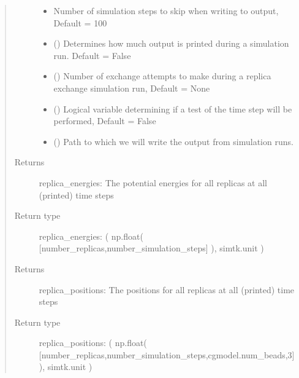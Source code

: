 \documentclass[letterpaper,12pt,english,openany,oneside]{sphinxmanual}
\begin{document}
\begin{fulllineitems}
\begin{quote}
\begin{description}
\begin{itemize}
\item {} 
 \textendash{} Number of simulation steps to skip when writing to output, Default = 100

\item {} 
 () \textendash{} Determines how much output is printed during a simulation run.  Default = False

\item {} 
 () \textendash{} Number of exchange attempts to make during a replica exchange simulation run, Default = None

\item {} 
 () \textendash{} Logical variable determining if a test of the time step will be performed, Default = False

\item {} 
 () \textendash{} Path to which we will write the output from simulation runs.

\end{itemize}

\item[{Returns}] \leavevmode
replica\_energies: The potential energies for all replicas at all (printed) time steps

\item[{Return type}] \leavevmode

replica\_energies:  ( np.float( {[}number\_replicas,number\_simulation\_steps{]} ), simtk.unit )


\item[{Returns}] \leavevmode
replica\_positions: The positions for all replicas at all (printed) time steps

\item[{Return type}] \leavevmode

replica\_positions:  ( np.float( {[}number\_replicas,number\_simulation\_steps,cgmodel.num\_beads,3{]} ), simtk.unit )



\end{description}
\end{quote}
\end{fulllineitems}
\end{document}
